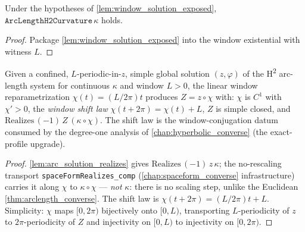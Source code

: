 \begin{lemma}
  \label{lem:arclength_h2_curvature_of_window_solution}
  Under the hypotheses of \cref{lem:window_solution_exposed},
  $\texttt{ArcLengthH2Curvature}\,\kappa$ holds.
\end{lemma}

\begin{proof}
  \leanok
  Package \cref{lem:window_solution_exposed} into the window existential with
  witness $L$.
\end{proof}

\begin{lemma}
  \label{lem:arclength_h2_converse_at}
  Given a confined, $L$-periodic-in-$z$, simple global solution $(z,\varphi)$
  of the H\textsuperscript{2} arc-length system for continuous $\kappa$ and
  window $L>0$, the linear window reparametrization $\chi(t)=(L/2\pi)t$
  produces $Z=z\circ\chi$ with: $\chi$ is $C^1$ with $\chi'>0$, the
  \emph{window shift law} $\chi(t+2\pi)=\chi(t)+L$, $Z$ is simple closed, and
  $\mathrm{Realizes}\,(-1)\,Z\,(\kappa\circ\chi)$. The shift law is the
  window-conjugation datum consumed by the degree-one analysis of
  \cref{chap:hyperbolic_converse} (the exact-profile upgrade).
\end{lemma}

\begin{proof}
  \leanok
  \cref{lem:arc_solution_realizes} gives $\mathrm{Realizes}\,(-1)\,z\,\kappa$;
  the no-rescaling transport \texttt{spaceFormRealizes\_comp}
  (\cref{chap:spaceform_converse} infrastructure) carries it along $\chi$ to
  $\kappa\circ\chi$ — \emph{not} $\kappa$: there is no scaling step, unlike the
  Euclidean \cref{thm:arclength_converse}. The shift law is
  $\chi(t+2\pi)=(L/2\pi)t+L$. Simplicity: $\chi$ maps $[0,2\pi)$ bijectively
  onto $[0,L)$, transporting $L$-periodicity of $z$ to $2\pi$-periodicity of
  $Z$ and injectivity on $[0,L)$ to injectivity on $[0,2\pi)$.
\end{proof}

